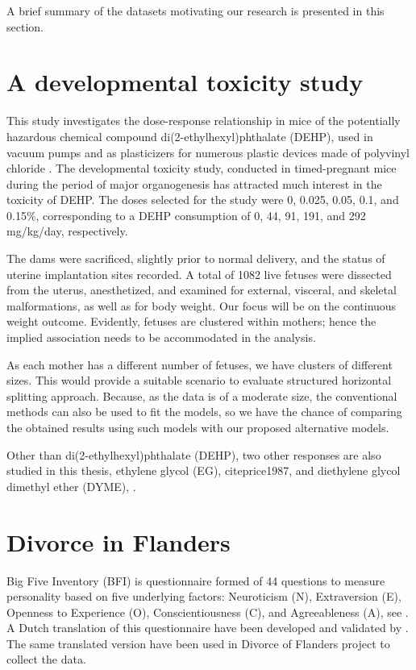 \documentclass[11pt,a5paper,twoside]{book}
\begin{document}
A brief summary of the datasets motivating our research is presented in this section.
\section{A developmental toxicity study} 
\label{motive_tox}
This study investigates the dose-response
relationship in mice of the potentially hazardous chemical compound di(2-ethylhexyl)phthalate
(DEHP), used in vacuum pumps and as plasticizers for numerous plastic devices made of polyvinyl chloride \citep{tyl1988}. The developmental toxicity study, conducted in timed-pregnant
mice during the period of major organogenesis has attracted
much interest in the toxicity of DEHP. The doses selected for the study were 0, 0.025, 0.05, 0.1,
and 0.15\%, corresponding to a DEHP consumption of 0, 44, 91, 191, and 292 mg/kg/day, respectively.

The dams were sacrificed, slightly prior to normal delivery, and the status of uterine implantation sites recorded. A total of 1082 live fetuses were dissected from the uterus, anesthetized, and examined for external, visceral, and skeletal malformations, as well as for body
weight. Our focus will be on the continuous weight outcome. Evidently, fetuses are clustered within mothers; hence the implied association needs to be accommodated in the analysis. 

As each mother has a different number of fetuses, we have clusters of different sizes. This would provide a suitable scenario to evaluate structured horizontal splitting approach. Because, as the data is of a moderate size, the conventional methods can also be used to fit the models, so we have the chance of comparing the obtained results using such models with our proposed alternative models.

Other than di(2-ethylhexyl)phthalate (DEHP), two other responses are also studied in this thesis, ethylene glycol (EG), cite{price1987}, and diethylene glycol dimethyl ether (DYME), \cite{price1985}.

\section{Divorce in Flanders} 

Big Five Inventory (BFI) is questionnaire formed of 44 questions to measure personality based on five underlying factors: Neuroticism (N), Extraversion (E), Openness to Experience (O), Conscientiousness (C), and Agreeableness (A), see \cite{john1999}. A Dutch translation of this questionnaire have been developed and validated by \cite{denissen2008}. The same translated version have been used in Divorce of Flanders project to collect the data.  
\end{document}
